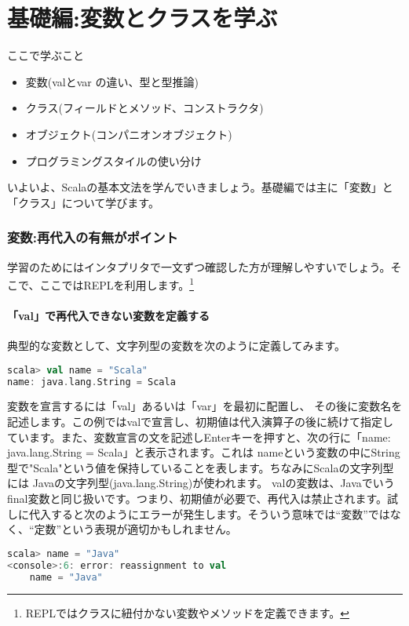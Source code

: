 \part{基礎編:変数とクラスを学ぶ}
\begin{itembox}[l]{ここで学ぶこと}
\begin{itemize}
\item 変数(valとvar の違い、型と型推論) 
\item クラス(フィールドとメソッド、コンストラクタ) 
\item オブジェクト(コンパニオンオブジェクト)
\item プログラミングスタイルの使い分け
\end{itemize}
\end{itembox}
いよいよ、Scalaの基本文法を学んでいきましょう。基礎編では主に「変数」と「クラス」について学びます。

\section{変数:再代入の有無がポイント}
学習のためにはインタプリタで一文ずつ確認した方が理解しやすいでしょう。そこで、ここではREPLを利用します。\footnote{REPLではクラスに紐付かない変数やメソッドを定義できます。}
\subsection{「val」で再代入できない変数を定義する}
典型的な変数として、文字列型の変数を次のように定義してみます。

\begin{lstlisting}[language=scala, frame=none]
scala> val name = "Scala"
name: java.lang.String = Scala
\end{lstlisting}

変数を宣言するには「val」あるいは「var」を最初に配置し、 その後に変数名を記述します。この例ではvalで宣言し、初期値は代入演算子の後に続けて指定しています。また、変数宣言の文を記述しEnterキーを押すと、次の行に「name: java.lang.String = Scala」と表示されます。これは nameという変数の中にString型で"Scala"という値を保持していることを表します。ちなみにScalaの文字列型には Javaの文字列型(java.lang.String)が使われます。 valの変数は、Javaでいうfinal変数と同じ扱いです。つまり、初期値が必要で、再代入は禁止されます。試しに代入すると次のようにエラーが発生します。そういう意味では“変数”ではなく、“定数”という表現が適切かもしれません。

\begin{lstlisting}[language=scala, frame=none]
scala> name = "Java"
<console>:6: error: reassignment to val
    name = "Java"
\end{lstlisting}

